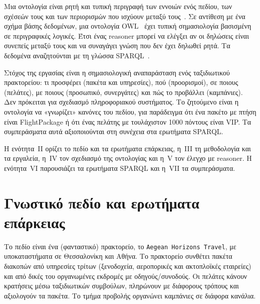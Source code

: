 \documentclass[conference]{IEEEtran}
\newcommand{\cls}[1]{\textsf{#1}}          %
\newcommand{\ind}[1]{\texttt{#1}}          %
\begin{document}
Μια οντολογία είναι ρητή και τυπική περιγραφή των εννοιών ενός πεδίου, των σχέσεών
τους και των περιορισμών που ισχύουν μεταξύ τους~\cite{noy2001,antoniou}. Σε αντίθεση
με ένα σχήμα βάσης δεδομένων, μια οντολογία OWL~\cite{owl2primer} έχει τυπική
σημασιολογία βασισμένη σε περιγραφικές λογικές. Έτσι ένας reasoner μπορεί να ελέγξει
αν οι δηλώσεις είναι συνεπείς μεταξύ τους και να συναγάγει γνώση που δεν έχει
δηλωθεί ρητά. Τα δεδομένα αναζητούνται με τη γλώσσα SPARQL~\cite{sparql11}.

Στόχος της εργασίας είναι η σημασιολογική αναπαράσταση ενός ταξιδιωτικού
πρακτορείου: τι προσφέρει (πακέτα και υπηρεσίες), πού (προορισμοί), σε ποιους
(πελάτες), με ποιους (προσωπικό, συνεργάτες) και πώς το προβάλλει (καμπάνιες).
Δεν πρόκειται για σχεδιασμό πληροφοριακού συστήματος. Το ζητούμενο είναι η
οντολογία να «γνωρίζει» κανόνες του πεδίου, για παράδειγμα ότι ένα πακέτο με
πτήση είναι \cls{FlightPackage} ή ότι ένας πελάτης με τουλάχιστον 1000 πόντους
είναι VIP. Τα συμπεράσματα αυτά αξιοποιούνται στη συνέχεια στα ερωτήματα SPARQL.

Η ενότητα~II ορίζει το πεδίο και τα ερωτήματα επάρκειας, η~III τη μεθοδολογία
και τα εργαλεία, η~IV τον σχεδιασμό της οντολογίας και η~V τον έλεγχο με reasoner.
Η ενότητα~VI παρουσιάζει τα ερωτήματα SPARQL και η~VII τα συμπεράσματα.

\section{Γνωστικό πεδίο και ερωτήματα επάρκειας}

Το πεδίο είναι ένα (φανταστικό) πρακτορείο, το \ind{Aegean Horizons Travel}, με
υποκαταστήματα σε Θεσσαλονίκη και Αθήνα. Το πρακτορείο συνθέτει πακέτα διακοπών
από υπηρεσίες τρίτων (ξενοδοχεία, αεροπορικές και ακτοπλοϊκές εταιρείες) και από
δικές του οργανωμένες εκδρομές με οδηγούς/συνοδούς. Οι πελάτες κάνουν κρατήσεις
μέσω ταξιδιωτικών συμβούλων, πληρώνουν με διάφορους τρόπους και αξιολογούν τα
πακέτα. Το τμήμα προβολής οργανώνει καμπάνιες σε διάφορα κανάλια.
\end{document}
